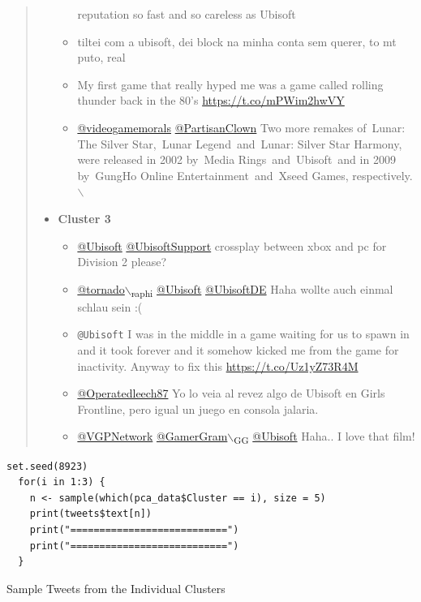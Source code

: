 \documentclass[11pt]{article}
\begin{document}
\begin{quote}
\begin{itemize}
\begin{itemize}
reputation so fast and so careless as Ubisoft
\item tiltei com a ubisoft, dei block na minha conta sem querer, to mt puto, real
\item My first game that really hyped me was a game called rolling thunder back in
the 80’s \url{https://t.co/mPWim2hwVY}
\item \href{https://twitter.com/search?q=\%40videogamemorals}{@videogamemorals} \href{https://twitter.com/search?q=\%40PartisanClown}{@PartisanClown} Two more remakes of Lunar: The Silver
Star, Lunar Legend and Lunar: Silver Star Harmony, were released in 2002
by Media Rings and Ubisoft and in 2009 by GungHo Online
Entertainment and Xseed Games, respectively.$\backslash$
\end{itemize}
\item \textbf{Cluster 3}
\begin{itemize}
\item \href{https://twitter.com/search?q=\%40Ubisoft}{@Ubisoft} \href{https://twitter.com/search?q=\%40UbisoftSupport}{@UbisoftSupport} crossplay between xbox and pc for Division 2
please?
\item \href{https://twitter.com/search?q=\%40tornado\_raphi}{@tornado$\backslash$\textsubscript{raphi}} \href{https://twitter.com/search?q=\%40Ubisoft}{@Ubisoft} \href{https://twitter.com/search?q=\%40UbisoftDE}{@UbisoftDE} Haha wollte auch einmal schlau sein
:(
\item \texttt{@Ubisoft} I was in the middle in a game waiting for us to spawn in and it
took forever and it somehow kicked me from the game for inactivity. Anyway to
fix this \url{https://t.co/Uz1yZ73R4M}
\item \href{https://twitter.com/search?q=\%40Operatedleech87}{@Operatedleech87} Yo lo veia al revez algo de Ubisoft en Girls Frontline,
pero igual un juego en consola jalaria.
\item \href{https://twitter.com/search?q=\%40VGPNetwork}{@VGPNetwork} \href{https://twitter.com/search?q=\%40GamerGram\_GG}{@GamerGram$\backslash$\textsubscript{GG}} \href{https://twitter.com/search?q=\%40Ubisoft}{@Ubisoft} Haha.. I love that film!
\end{itemize}
\end{itemize}
\end{quote}


\begin{listing}[htbp]
\begin{verbatim}
set.seed(8923)
  for(i in 1:3) {
    n <- sample(which(pca_data$Cluster == i), size = 5)
    print(tweets$text[n])
    print("===========================")
    print("===========================")
  }
\end{verbatim}
\caption{\label{orgfdc47fe}Sample Tweets from the Individual Clusters}
\end{listing}
\end{document}
